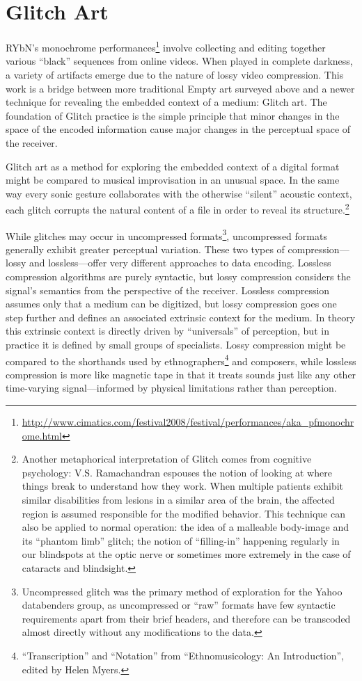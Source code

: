 \documentclass{thesis}
\begin{document}
\section{Glitch Art}

RYbN's monochrome performances\footnote{\url{http://www.cimatics.com/festival2008/festival/performances/aka_pfmonochrome.html}} involve collecting and editing together various ``black'' sequences from online videos. When played in complete darkness, a variety of artifacts emerge due to the nature of lossy video compression. This work is a bridge between more traditional Empty art surveyed above and a newer technique for revealing the embedded context of a medium: Glitch art. The foundation of Glitch practice is the simple principle that minor changes in the space of the encoded information cause major changes in the perceptual space of the receiver.

Glitch art as a method for exploring the embedded context of a digital format might be compared to musical improvisation in an unusual space. In the same way every sonic gesture collaborates with the otherwise ``silent'' acoustic context, each glitch corrupts the natural content of a file in order to reveal its structure.\footnote{Another metaphorical interpretation of Glitch comes from cognitive psychology: V.S. Ramachandran espouses the notion of looking at where things break to understand how they work\cite{ramachandran_phantoms_1999}. When multiple patients exhibit similar disabilities from lesions in a similar area of the brain, the affected region is assumed responsible for the modified behavior. This technique can also be applied to normal operation: the idea of a malleable body-image and its ``phantom limb'' glitch; the notion of ``filling-in'' happening regularly in our blindspots at the optic nerve or sometimes more extremely in the case of cataracts and blindsight.}

While glitches may occur in uncompressed formats\footnote{Uncompressed glitch was the primary method of exploration for the Yahoo databenders group\cite{indianropeburn_databenders_????}, as uncompressed or ``raw'' formats have few syntactic requirements apart from their brief headers, and therefore can be transcoded almost directly without any modifications to the data.}, uncompressed formats generally exhibit greater perceptual variation. These two types of compression---lossy and lossless---offer very different approaches to data encoding. Lossless compression algorithms are purely syntactic, but lossy compression considers the signal's semantics from the perspective of the receiver. Lossless compression assumes only that a medium can be digitized, but lossy compression goes one step further and defines an associated extrinsic context for the medium. In theory this extrinsic context is directly driven by ``universals'' of perception, but in practice it is defined by small groups of specialists. Lossy compression might be compared to the shorthands used by ethnographers\footnote{``Transcription'' and ``Notation'' from ``Ethnomusicology: An Introduction'', edited by Helen Myers.} and composers, while lossless compression is more like magnetic tape in that it treats sounds just like any other time-varying signal---informed by physical limitations rather than perception.
\end{document}
